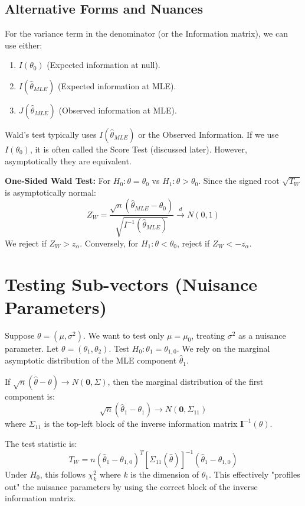 \documentclass[12pt, a4paper]{article}
\theoremstyle{definition}
\begin{document}
\subsection{Alternative Forms and Nuances}
For the variance term in the denominator (or the Information matrix), we can use either:
\begin{enumerate}
    \item $I(\theta_0)$ (Expected information at null).
    \item $I(\hat{\theta}_{MLE})$ (Expected information at MLE).
    \item $J(\hat{\theta}_{MLE})$ (Observed information at MLE).
\end{enumerate}
Wald's test typically uses $I(\hat{\theta}_{MLE})$ or the Observed Information.
If we use $I(\theta_0)$, it is often called the Score Test (discussed later).
However, asymptotically they are equivalent.

\textbf{One-Sided Wald Test:}
For $H_0: \theta = \theta_0$ vs $H_1: \theta > \theta_0$.
Since the signed root $\sqrt{T_W}$ is asymptotically normal:
$$ Z_W = \frac{\sqrt{n}(\hat{\theta}_{MLE} - \theta_0)}{\sqrt{I^{-1}(\hat{\theta}_{MLE})}} \xrightarrow{d} N(0, 1) $$
We reject if $Z_W > z_\alpha$.
Conversely, for $H_1: \theta < \theta_0$, reject if $Z_W < -z_\alpha$.

\section{Testing Sub-vectors (Nuisance Parameters)}
Suppose $\theta = (\mu, \sigma^2)$. We want to test only $\mu = \mu_0$, treating $\sigma^2$ as a nuisance parameter.
Let $\theta = (\theta_1, \theta_2)$. Test $H_0: \theta_1 = \theta_{1,0}$.
We rely on the marginal asymptotic distribution of the MLE component $\hat{\theta}_1$.

If $\sqrt{n}(\hat{\theta} - \theta) \to N(\mathbf{0}, \Sigma)$, then the marginal distribution of the first component is:
$$ \sqrt{n}(\hat{\theta}_1 - \theta_1) \to N(\mathbf{0}, \Sigma_{11}) $$
where $\Sigma_{11}$ is the top-left block of the inverse information matrix $\mathbf{I}^{-1}(\theta)$.

The test statistic is:
$$ T_W = n (\hat{\theta}_1 - \theta_{1,0})^T [\Sigma_{11}(\hat{\theta})]^{-1} (\hat{\theta}_1 - \theta_{1,0}) $$
Under $H_0$, this follows $\chi^2_k$ where $k$ is the dimension of $\theta_1$.
This effectively "profiles out" the nuisance parameters by using the correct block of the inverse information matrix.
\end{document}
